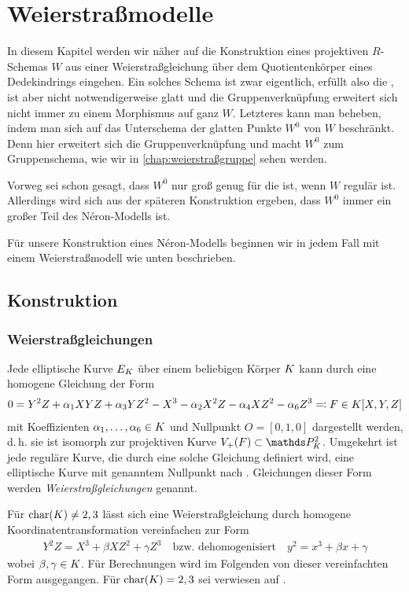 \chapter{Weierstraßmodelle}\label{chap:weierstraßmodelle}
In diesem Kapitel werden wir näher auf die Konstruktion eines
projektiven $R$-Schemas $W$ aus einer Weierstraßgleichung über dem
Quotientenkörper eines Dedekindrings eingehen.
Ein solches Schema ist zwar eigentlich, erfüllt also die \NAbbEig, ist
aber nicht notwendigerweise glatt und die Gruppenverknüpfung
erweitert sich nicht immer zu einem Morphismus auf ganz $W$.
Letzteres kann man beheben, indem man sich auf das Unterschema der
glatten Punkte $W^0$ von $W$ beschränkt. Denn hier erweitert sich die
Gruppenverknüpfung und macht $W^0$ zum Gruppenschema, wie wir in
\autoref{chap:weierstraßgruppe} sehen werden.

Vorweg sei schon gesagt, dass $W^0$ nur groß genug für die
\NAbbEig ist, wenn $W$ regulär ist. Allerdings wird sich aus
der späteren Konstruktion ergeben, dass $W^0$ immer ein großer Teil
des Néron-Modells ist.

Für unsere Konstruktion eines Néron-Modells beginnen wir in jedem Fall
mit einem Weierstraßmodell wie unten beschrieben.

\section{Konstruktion}
\subsection{Weierstraßgleichungen}
Jede elliptische Kurve $E_{K}$ über einem beliebigen Körper $K$ kann
durch eine homogene Gleichung der Form
\begin{gather*}
  0 = Y^2 Z + \alpha_1 XYZ + \alpha_3 YZ^2 - X^3 - \alpha_2X^2 Z - \alpha_4 XZ^2 - \alpha_6 Z^3
  \eqqcolon F\in K[X,Y,Z]
\end{gather*}
mit Koeffizienten $\alpha_1,\dotsc,\alpha_6\in K$ und Nullpunkt $O=[0,1,0]$
dargestellt werden, d.\,h. sie ist isomorph zur projektiven Kurve
$V_+(F)\subset\P_\K^2$.
Umgekehrt ist jede reguläre Kurve, die durch eine
solche Gleichung definiert wird, eine elliptische Kurve mit genanntem
Nullpunkt nach \cite[Proposition III.3.1]{silverman}.
Gleichungen dieser Form werden \emph{Weierstraßgleichungen} genannt.

Für $\operatorname{char}(K)\neq 2,3$ lässt sich eine Weierstraßgleichung durch
homogene Koordinatentransformation vereinfachen zur Form
\begin{gather*}
  Y^2 Z = X^3 + \beta XZ^2 + \gamma Z^3
  \quad\text{bzw. dehomogenisiert}\quad
  y^2 = x^3 + \beta x + \gamma
\end{gather*}
wobei $\beta,\gamma\in K$.
Für Berechnungen wird im Folgenden von dieser vereinfachten Form
ausgegangen. Für $\operatorname{char}(K)=2,3$ sei verwiesen auf
\cite[Appendix: Elliptic Curves in Characteristics 2 and 3]{silverman}.


